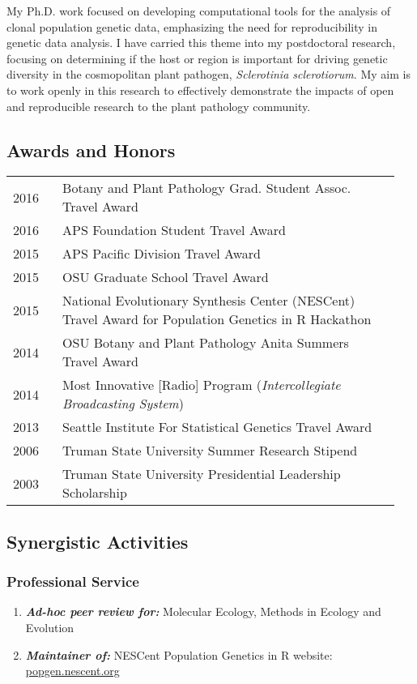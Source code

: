 \documentclass[12pt,letterpaper]{article}
\begin{document}
My Ph.D. work focused on developing computational tools for the analysis of
clonal population genetic data, emphasizing the need for reproducibility in
genetic data analysis. I have carried this theme into my postdoctoral research,
focusing on determining if the host or region is important for driving genetic
diversity in the cosmopolitan plant pathogen, \textit{Sclerotinia sclerotiorum}.
My aim is to work openly in this research to effectively demonstrate the impacts
of open and reproducible research to the plant pathology community.

\subsection*{Awards and Honors}

\begin{tabular}{p{0.125\linewidth}p{0.825\linewidth}}

2016 & Botany and Plant Pathology Grad. Student Assoc. Travel Award\\
2016 & APS Foundation Student Travel Award\\
2015 & APS Pacific Division Travel Award\\
2015 & OSU Graduate School Travel Award\\
2015 & National Evolutionary Synthesis Center (NESCent) Travel Award for Population Genetics in R Hackathon\\
2014 & OSU Botany and Plant Pathology Anita Summers Travel Award\\
2014 & Most Innovative [Radio] Program (\textit{Intercollegiate Broadcasting System})\\
2013 & Seattle Institute For Statistical Genetics Travel Award\\
2006 & Truman State University Summer Research Stipend\\
2003 & Truman State University Presidential Leadership Scholarship

\end{tabular}

\subsection*{Synergistic Activities}

\subsubsection*{Professional Service}
\begin{enumerate}
	
	\item \textit{\textbf{Ad-hoc peer review for:}} Molecular Ecology, Methods in Ecology and Evolution
	\item \textit{\textbf{Maintainer of:}} NESCent Population Genetics in R  website: 
                                 \href{http://popgen.nescent.org}{popgen.nescent.org}
\end{enumerate}
\end{document}
